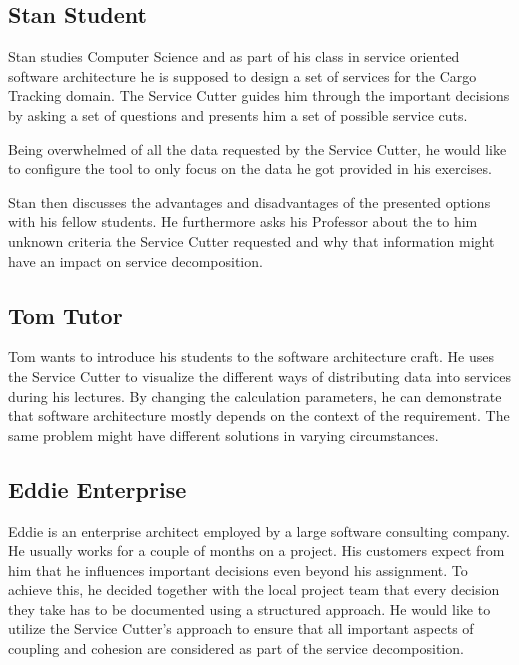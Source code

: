 \subsection{Stan Student}

Stan studies Computer Science and as part of his class in service oriented software architecture he is supposed to design a set of services for the Cargo Tracking\cite{dddGithub} domain. The Service Cutter guides him through the important decisions by asking a set of questions and presents him a set of possible service cuts. 

Being overwhelmed of all the data requested by the Service Cutter, he would like to configure the tool to only focus on the data he got provided in his exercises. 

Stan then discusses the advantages and disadvantages of the presented options with his fellow students. He furthermore asks his Professor about the to him unknown criteria the Service Cutter requested and why that information might have an impact on service decomposition. 


\subsection{Tom Tutor}

Tom wants to introduce his students to the software architecture craft. He uses the Service Cutter to visualize the different ways of distributing data into services during his lectures. By changing the calculation parameters, he can demonstrate that software architecture mostly depends on the context of the requirement. The same problem might have different solutions in varying circumstances.

\subsection{Eddie Enterprise}

Eddie is an enterprise architect employed by a large software consulting company. He usually works for a couple of months on a project. His customers expect from him that he influences important decisions even beyond his assignment. To achieve this, he decided together with the local project team that every decision they take has to be documented using a structured approach. He would like to utilize the Service Cutter's approach to ensure that all important aspects of coupling and cohesion are considered as part of the service decomposition.
